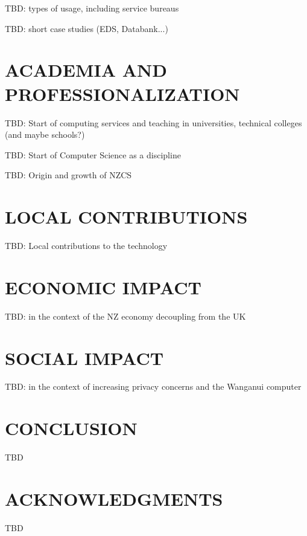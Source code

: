 \documentclass{IEEEcsmag}
\begin{document}
TBD: types of usage, including service bureaus

TBD: short case studies (EDS, Databank...)

\vspace*{-8pt}
\section{ACADEMIA AND PROFESSIONALIZATION}

TBD: Start of computing services and teaching in universities, technical colleges (and maybe schools?)

TBD: Start of Computer Science as a discipline

TBD: Origin and growth of NZCS

\vspace*{-8pt}
\section{LOCAL CONTRIBUTIONS}

 TBD: Local contributions to the technology 

\vspace*{-8pt}
\section{ECONOMIC IMPACT}

TBD: in the context of the NZ economy decoupling from the UK

\vspace*{-8pt}
\section{SOCIAL IMPACT}

TBD: in the context of increasing privacy concerns and the Wanganui computer

\vspace*{-8pt}
\section{CONCLUSION}

TBD

\vspace*{-8pt}
\section{ACKNOWLEDGMENTS}

TBD



\end{document}
